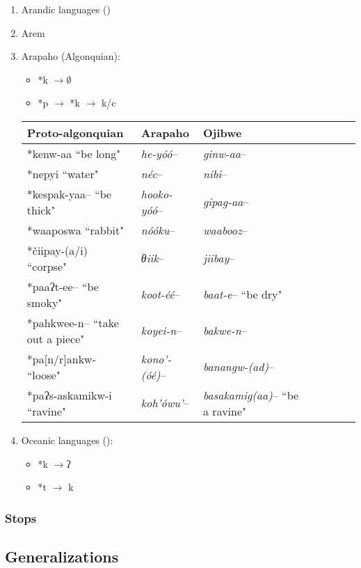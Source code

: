 \documentclass[oldfontcommands,oneside,a4paper,11pt]{article}
\newcommand{\ipa}[1]{{\phon \mbox{#1}}} %
\begin{document}
  \begin{enumerate}
  \item  Arandic languages (\citealt{koch04arandic})
\item Arem \citet{ferlus96monosyllabisme}
\item   Arapaho (Algonquian):

 \begin{itemize}
\item \ipa{*k} $\rightarrow \emptyset$
\item \ipa{*p} $\rightarrow$ \ipa{*k} $\rightarrow$  \ipa{k/c}
\end{itemize}

 \begin{table}[H]
 \centering  \label{tab:k.zero}
\begin{tabular}{lllllll}
\toprule
Proto-algonquian & Arapaho & Ojibwe \\
\midrule
  \ipa{*kenw-aa} ``be long" & \textit{he-yóó}--    &  \textit{ginw-aa}-- \\
  \ipa{*nepyi} ``water" & \textit{néc}--    &  \textit{nibi}-- \\
 \ipa{*kespak-yaa--} ``be thick" & \textit{hooko-yóó}--    &  \textit{gipag-aa}-- \\
 \ipa{*waaposwa} ``rabbit" & \textit{nóóku}--    &  \textit{waabooz}-- \\
  \ipa{*čiipay-(a/i)} ``corpse" & \textit{θiik}--    &  \textit{jiibay}-- \\
  \ipa{*paaʔt-ee--} ``be smoky" & \textit{koot-éé}--    &  \textit{baat-e}-- ``be dry"\\
    \ipa{*pahkwee-n--} ``take out a piece" & \textit{koyei-n}--    &  \textit{bakwe-n}-- \\
        \ipa{*pa[n/r]ankw-} ``loose" & \textit{kono'-(óé)}--    &  \textit{banangw-(ad)}-- \\ 
   \ipa{*paʔs-askamikw-i} ``ravine" & \textit{koh'ówu'}--    &  \textit{basakamig(aa)}-- ``be a ravine"\\ 
\bottomrule
\end{tabular}
\end{table}

\item Oceanic languages (\citealt{blust04tk}):
 
 \begin{itemize}
\item \ipa{*k} $\rightarrow $\ipa{ʔ}
\item \ipa{*t} $\rightarrow$ \ipa{k}  
\end{itemize} 
 
 \end{enumerate}
 
 
 \subsubsection{Stops}
 \citet{michailovsky10kiranti}
 
 
 \subsection{Generalizations}






\end{document}
